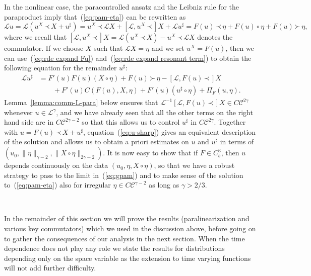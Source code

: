 \documentclass[a4paper,11pt]{article}
\newcommand{\LL}{\mathscr{L}}
\newcommand{\CC}{\mathscr{C}}
\newcommand{\lpara}{\,\mathord{\prec}\,}
\newcommand{\rpara}{\,\mathord{\succ}\,}
\newcommand{\reso}{\,\mathord{\circ}\,}
\begin{document}
In the nonlinear case, the paracontrolled ansatz and the Leibniz rule for the
paraproduct imply that~(\ref{eq:pam-eta}) can be rewritten as
\[
   \LL u = \LL (u^X \lpara X + u^{\sharp}) = u^X \lpara \LL X + \left[ \LL, u^X \lpara \right] X + \LL u^{\sharp} = F (u) \lpara \eta + F (u) \reso \eta + F(u) \rpara \eta,
\]
where we recall that $\left[ \LL, u^X \lpara \right] X = \LL (u^X \lpara X) -
u^X \lpara \LL X$ denotes the commutator. If we choose $X$ such that $\LL X =
\eta$ and we set $u^X = F (u)$, then we can use~(\ref{eq:rde expand Fu})
and~(\ref{eq:rde expand resonant term}) to obtain the following equation for
the remainder $u^{\sharp}$:
\begin{equation}
  \begin{array}{ll}
    \LL u^{\sharp} & = F' (u) F (u)  (X \reso \eta) + F (u) \rpara \eta -
    \left[ \LL, F (u) \lpara \right] X\\
    & \hspace{2em} + F' (u) C (F (u), X, \eta) + F' (u)  (u^{\sharp} \reso
    \eta) + \Pi_F (u, \eta) .
  \end{array} \label{eq:u-sharp}
\end{equation}
Lemma~\ref{lemma:comm-L-para} below ensures that $\LL^{- 1} \left[ \LL, F (u)
\lpara \right] X \in C \CC^{2 \gamma}$ whenever $u \in \LL^{\gamma}$, and we
have already seen that all the other terms on the right hand side are in $C
\CC^{2 \gamma - 2}$ so that this allows us to control $u^{\sharp}$ in $C
\CC^{2 \gamma}$. Together with $u = F (u) \lpara X + u^{\sharp}$,
equation~(\ref{eq:u-sharp}) gives an equivalent description of the solution
and allows us to obtain a priori estimates on $u$ and $u^{\sharp}$ in terms of
$(u_0, \| \eta \|_{\gamma - 2}, \|X \reso \eta \|_{2 \gamma - 2})$. It is now
easy to show that if $F \in C^3_b$, then $u$ depends continuously on the data
$(u_0, \eta, X \reso \eta)$, so that we have a robust strategy to pass to the
limit in~(\ref{eq:gpam}) and to make sense of the solution
to~(\ref{eq:pam-eta}) also for irregular $\eta \in C \CC^{\gamma - 2}$ as long
as $\gamma > 2 / 3$.

\

In the remainder of this section we will prove the results (paralinearization
and various key commutators) which we used in the discussion above, before
going on to gather the consequences of our analysis in the next section. When
the time dependence does not play any role we state the results for
distributions depending only on the space variable as the extension to time
varying functions will not add further difficulty.
\end{document}
